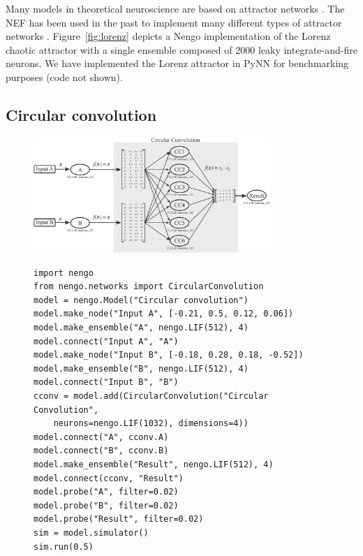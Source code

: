 \documentclass{frontiersSCNS}
\begin{document}
Many models in theoretical neuroscience
are based on attractor networks \cite{TODO}. %
The NEF has been used in the past
to implement many different types of
attractor networks \cite{TODO}.
Figure~\ref{fig:lorenz} depicts
a Nengo implementation of the Lorenz chaotic attractor
with a single ensemble
composed of 2000 leaky integrate-and-fire neurons.
We have implemented the Lorenz attractor
in PyNN for benchmarking purposes
(code not shown).

\subsection{Circular convolution} \label{sec:cconv}

\begin{figure}
\begin{center}
  \includegraphics[width=0.8\textwidth]{cconv}
  \begin{minipage}{0.46\textwidth}
    \begin{lstlisting}[basicstyle={\footnotesize\ttfamily}]
import nengo
from nengo.networks import CircularConvolution
model = nengo.Model("Circular convolution")
model.make_node("Input A", [-0.21, 0.5, 0.12, 0.06])
model.make_ensemble("A", nengo.LIF(512), 4)
model.connect("Input A", "A")
model.make_node("Input B", [-0.18, 0.28, 0.18, -0.52])
model.make_ensemble("B", nengo.LIF(512), 4)
model.connect("Input B", "B")
cconv = model.add(CircularConvolution("Circular Convolution",
    neurons=nengo.LIF(1032), dimensions=4))
model.connect("A", cconv.A)
model.connect("B", cconv.B)
model.make_ensemble("Result", nengo.LIF(512), 4)
model.connect(cconv, "Result")
model.probe("A", filter=0.02)
model.probe("B", filter=0.02)
model.probe("Result", filter=0.02)
sim = model.simulator()
sim.run(0.5)
    \end{lstlisting}
  \end{minipage}
  \begin{minipage}{0.46\textwidth}

\end{minipage}
\end{center}
\end{figure}
\end{document}
